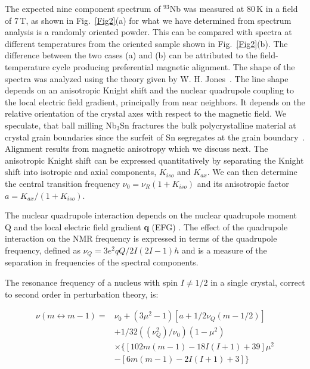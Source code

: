 \documentclass[aps,prl,reprint,superscriptaddress]{revtex4-2}
\begin{document}
	
	The expected nine component spectrum of $^{93}$Nb was measured at 80\,K in a field of 7\,T, as shown in Fig.~\ref{Fig2}(a) for what we have determined from spectrum analysis is a randomly oriented powder. This can be compared with spectra at different temperatures from the oriented sample  shown in Fig.~\ref{Fig2}(b). The difference between the two cases (a) and (b) can be attributed to the field-temperature cycle producing preferential magnetic alignment. The shape of the spectra was analyzed using the theory given by W. H. Jones~\cite{Jon.63}. The line shape depends on an anisotropic Knight shift and the nuclear quadrupole coupling to the local electric field gradient, principally from near neighbors. It depends on the relative orientation of the crystal axes with respect to the magnetic field. We speculate, that ball milling Nb$_3$Sn fractures  the bulk polycrystalline material at crystal grain boundaries since the surfeit of Sn segregates at the grain boundary~\cite{Zho.11}. Alignment results from magnetic anisotropy which we discuss next. 	
	The anisotropic Knight shift can be expressed quantitatively by separating the Knight shift into isotropic and axial components, $K_{iso}$ and $K_{ax}$. We can then determine the central transition frequency $\nu_0=\nu_R (1+K_{iso})$ and its anisotropic factor $a=K_{ax}/(1+K_{iso})$.
	
	The nuclear quadrupole interaction depends on the nuclear quadrupole moment Q and the local electric field gradient {\bf q} (EFG) . The effect of the quadrupole interaction on the NMR frequency is expressed in terms of the quadrupole frequency, defined as $\nu_Q=3e^2qQ/2I(2I-1)h$ and is a measure of the separation in frequencies of the spectral components.
	
	The resonance frequency of a nucleus with spin $I\neq1/2$ in a single crystal, correct to  second order in perturbation theory, is:
	
	\begin{equation}
	\begin{split}
	\nu(m \leftrightarrow m-1)=&\nu_0+(3\mu^2-1)[a+1/2 \nu_Q (m-1/2)]\\
	&+1/32 ((\nu_Q^2)/\nu_0 )(1-\mu^2 )\\
	&\times\{[102m(m-1)-18I(I+1)+39]\mu^2\\
	&-[6m(m-1)-2I(I+1)+3]\}
	\end{split}
	\label{SpectrumFit}
	\end{equation}
	
\end{document}

